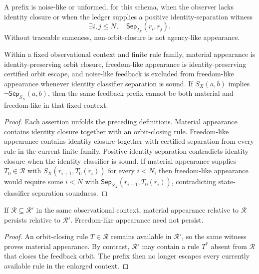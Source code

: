 \begin{definition}
\label{def:philosophy-noise-like-feedback}
A prefix is noise-like or unformed, for this schema, when the observer
lacks identity closure or when the ledger supplies a positive
identity-separation witness
$$
\exists i,j\leq N,\quad \mathsf{Sep}_{I_X}(r_i,r_j).
$$
Without traceable sameness, non-orbit-closure is not agency-like
appearance.
\end{definition}

\begin{proposition}
\label{prop:philosophy-materiality-orbit-escape-consequences}
Within a fixed observational context and finite rule family, material
appearance is identity-preserving orbit closure, freedom-like
appearance is identity-preserving certified orbit escape, and
noise-like feedback is excluded from freedom-like appearance whenever
identity classifier separation is sound. If $S_X(a,b)$ implies
$\neg\mathsf{Sep}_{S_X}(a,b)$, then the same feedback prefix cannot be
both material and freedom-like in that fixed context.
\end{proposition}
\begin{proof}
Each assertion unfolds the preceding definitions. Material appearance
contains identity closure together with an orbit-closing rule.
Freedom-like appearance contains identity closure together with
certified separation from every rule in the current finite family.
Positive identity separation contradicts identity closure when the
identity classifier is sound. If material appearance supplies
$T_0\in\mathcal R$ with $S_X(r_{i+1},T_0(r_i))$ for every $i<N$, then
freedom-like appearance would require some $i<N$ with
$\mathsf{Sep}_{S_X}(r_{i+1},T_0(r_i))$, contradicting state-classifier
separation soundness.
\end{proof}

\begin{proposition}
\label{prop:philosophy-rule-extension-appearance}
If $\mathcal R\subseteq\mathcal R'$ in the same observational context,
material appearance relative to $\mathcal R$ persists relative to
$\mathcal R'$. Freedom-like appearance need not persist.
\end{proposition}
\begin{proof}
An orbit-closing rule $T\in\mathcal R$ remains available in
$\mathcal R'$, so the same witness proves material appearance. By
contrast, $\mathcal R'$ may contain a rule $T^\ast$ absent from
$\mathcal R$ that closes the feedback orbit. The prefix then no longer
escapes every currently available rule in the enlarged context.
\end{proof}

